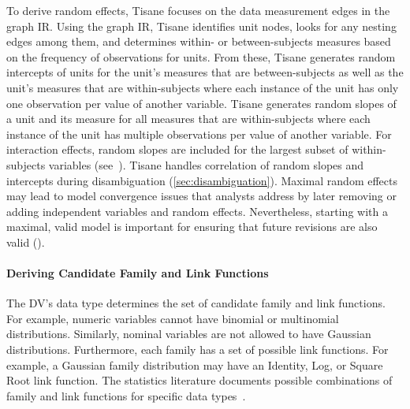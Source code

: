 To derive random effects, Tisane focuses on the data measurement edges in the
graph IR. Using the graph IR, Tisane identifies unit nodes, looks for any nesting
edges among them, and determines within- or between-subjects
measures based on the frequency of observations for units. %
From these, Tisane
generates random intercepts of units for the unit's measures that are between-subjects as well as the unit's measures that are within-subjects where each instance of the unit
has only one observation per value of another variable. Tisane generates random slopes of a unit and its measure for all measures
that are within-subjects where each instance of the unit has multiple
observations per value of another variable. For interaction effects, random
slopes are included for the largest subset of within-subjects variables (see~\cite{barr2013randomUpdated}). %
Tisane handles correlation of random slopes and intercepts during disambiguation (\autoref{sec:disambiguation}).
Maximal random effects may lead to model convergence issues that analysts
address by later removing or adding independent variables and random effects. Nevertheless, starting with
a maximal, valid model is important for ensuring that future revisions are also valid (\dcValidity).

\paragraph{Deriving Candidate Family and Link Functions} \label{sec:family_link_functions}
\tableFamilyLinkFunctions
The DV's data type determines the set of candidate family and
link functions. For example, numeric %
variables cannot have
binomial or multinomial distributions. Similarly, nominal variables are not
allowed to have Gaussian distributions. Furthermore, each family has a set of
possible link functions. For example, a Gaussian family distribution may have an
Identity, Log, or Square Root link function. The statistics literature documents
    possible combinations of family and link functions for specific data
types~\cite{nelder1972generalized}.

